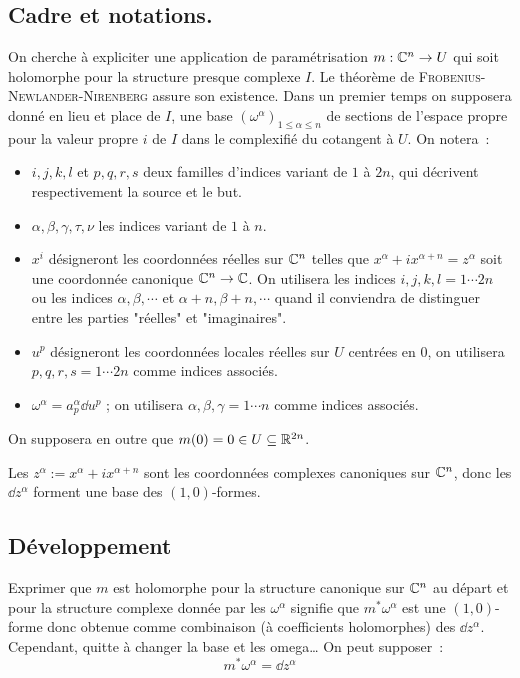 \documentclass[a4paper,draft]{amsart}
\begin{document}
\subsection{Cadre et notations.}
On cherche à expliciter une application de paramétrisation $m : \mathbb{C}^n \rightarrow U$ qui soit holomorphe pour la structure presque complexe $I$. Le théorème de \textsc{Frobenius-Newlander-Nirenberg} assure son existence. Dans un premier temps on supposera donné en lieu et place de $I$, une base $(\omega^\alpha)_{1 \leq \alpha \leq n}$ de sections de l'espace propre pour la valeur propre $i$ de $I$ dans le complexifié du cotangent à $U$.
On notera~:
\begin{itemize}
\item $i,j,k,l$ et $p,q,r,s$ deux familles d'indices variant de $1$ à $2n$, qui décrivent respectivement la source et le but.
\item $\alpha,\beta,\gamma, \tau, \nu$ les indices variant de $1$ à $n$.
\item $x^i$ désigneront les coordonnées réelles sur $\mathbb{C}^{n}$ telles que $x^\alpha + ix^{\alpha + n} = z^\alpha$ soit une coordonnée canonique $\mathbb{C}^n \rightarrow \mathbb{C}$. On utilisera les indices $i,j,k,l = 1 \cdots 2n$ ou les indices $\alpha,\beta,\cdots$ et $\alpha + n,\beta+n,\cdots$ quand il conviendra de distinguer entre les parties "réelles" et "imaginaires".
\item $u^p$ désigneront les coordonnées locales réelles sur $U$ centrées en $0$, on utilisera $p,q,r,s = 1 \cdots 2n$ comme indices associés.
\item $\omega^\alpha = a^\alpha_p \dd u^p$ ; on utilisera $\alpha, \beta, \gamma = 1 \cdots n$ comme indices associés.
\end{itemize}
On supposera en outre que $m(0)=0 \in U \subseteq \mathbb{R}^{2n}$.

Les $z^\alpha := x^\alpha + i x^{\alpha + n}$ sont les coordonnées complexes canoniques sur $\mathbb{C}^n$, donc les $\dd z^\alpha$ forment une base des $(1,0)$-formes.

\subsection{Développement}
Exprimer que $m$ est holomorphe pour la structure canonique sur $\mathbb{C}^n$ au départ et pour la structure complexe donnée par les $\omega^\alpha$ signifie que $m^* \omega^\alpha$ est une $(1,0)$-forme donc obtenue comme combinaison (à coefficients holomorphes) des $\dd z^\alpha$. Cependant, quitte à changer la base et les omega…
On peut supposer~:
\[
m^* \omega^\alpha = \dd z^\alpha
\]
\end{document}
